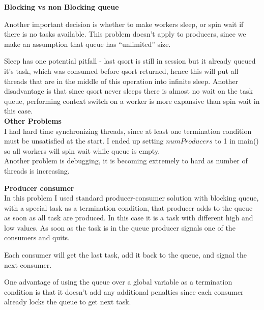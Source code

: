 \documentclass{article}
\begin{document}
\textbf{Blocking vs non Blocking queue}

Another important decision is whether to make workers sleep, or spin wait if there is no tasks available.
This problem doesn't apply to producers, since we make an assumption that queue has ``unlimited'' size.

Sleep has one potential pitfall - last qsort is still in session but it already queued it's task,
which was consumed before qsort returned, hence this will put all threads that are in the
middle of this operation into infinite sleep. Another disadvantage is that since qsort never
sleeps there is almost no wait on the task queue, performing context switch on a worker is more
expansive than spin wait in this case.\\

\textbf{Other Problems}\\
I had hard time synchronizing threads, since at least one termination condition must be
unsatisfied at the start.  I ended up setting $numProducers$ to 1 in main() so all workers will
spin wait while queue is empty.\\

Another problem is debugging, it is becoming extremely to hard as number of threads is
increasing.

\pagebreak
\textbf{Producer consumer}\\

In this problem I used standard producer-consumer solution with blocking queue, with a special
task as a termination condition, that producer adds to the queue as soon as all task are
produced. In this case it is a task with different high and low values.
As soon as the task is in the queue producer signals one of the consumers and quits. 

Each consumer will get the last task, add it back to the queue, and signal the next consumer.

One advantage of using the queue over a global variable as a termination condition is that it
doesn't add any additional penalties since each consumer already locks the queue to get next task.
\end{document}
